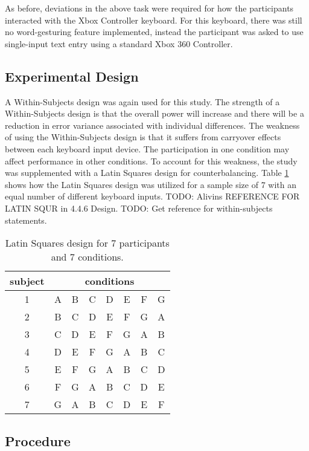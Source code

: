 As before, deviations in the above task were required for how the participants interacted with the Xbox Controller keyboard. For this keyboard, there was still no word-gesturing feature implemented, instead the participant was asked to use single-input text entry using a standard Xbox 360 Controller.

\subsection{Experimental Design} \label{pilot_experimental_design}

A Within-Subjects design was again used for this study. The strength of a Within-Subjects design is that the overall power will increase and there will be a reduction in error variance associated with individual differences. The weakness of using the Within-Subjects design is that it suffers from carryover effects between each keyboard input device. The participation in one condition may affect performance in other conditions. To account for this weakness, the study was supplemented with a Latin Squares design for counterbalancing. Table \ref{pilot_latin_squares} shows how the Latin Squares design was utilized for a sample size of 7 with an equal number of different keyboard inputs. TODO: Alivins REFERENCE FOR LATIN SQUR in 4.4.6 Design. TODO: Get reference for within-subjects statements.

\begin{table}[h] %
	\centering
	\caption[Latin Squares Design Rep 1]{\centering Latin Squares design for 7 participants and 7 conditions.}
	\label{pilot_latin_squares}
	\begin{tabular}{c | c c c c c c c}
		\hline
		subject & \multicolumn{7}{c}{conditions} \\
		\hline
		1 & A & B & C & D & E & F & G \\
		2 & B & C & D & E & F & G & A \\
		3 & C & D & E & F & G & A & B \\
		4 & D & E & F & G & A & B & C \\
		5 & E & F & G & A & B & C & D \\
		6 & F & G & A & B & C & D & E \\
		7 & G & A & B & C & D & E & F \\
		\hline
	\end{tabular}
\end{table}

\subsection{Procedure} \label{pre_procedure}

